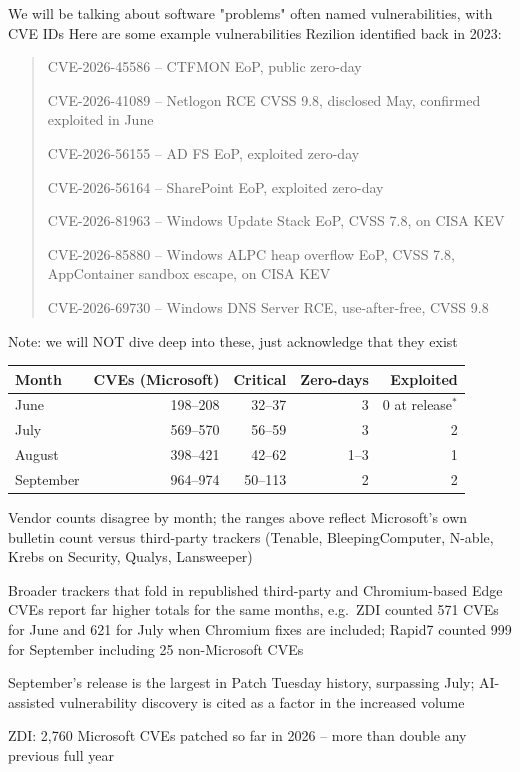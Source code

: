\documentclass[Screen16to9,17pt]{foils}
\begin{document}
We will be talking about software "problems" often named vulnerabilities, with CVE IDs
Here are some example vulnerabilities Rezilion identified back in 2023:
\begin{quote}
\begin{list2}
\item CVE-2026-45586 – CTFMON EoP, public zero-day
\item CVE-2026-41089 – Netlogon RCE CVSS 9.8, disclosed May, confirmed exploited in June
\item CVE-2026-56155 – AD FS EoP, exploited zero-day
\item CVE-2026-56164 – SharePoint EoP, exploited zero-day
\item CVE-2026-81963 – Windows Update Stack EoP, CVSS 7.8, on CISA KEV
\item CVE-2026-85880 – Windows ALPC heap overflow EoP, CVSS 7.8, AppContainer sandbox escape, on CISA KEV
\item CVE-2026-69730 – Windows DNS Server RCE, use-after-free, CVSS 9.8
\end{list2}
\end{quote}

Note: we will NOT dive deep into these, just acknowledge that they exist



\begin{tabularx}{22cm}{|X|r| r|r|r|}\hline
Month & CVEs (Microsoft) & Critical & Zero-days & Exploited \\\hline
June  & 198--208  & 32--37 & 3 & 0 at release$^{*}$ \\\hline
July  & 569--570  & 56--59 & 3 & 2 \\\hline
August & 398--421 & 42--62 & 1--3 & 1 \\\hline
September & 964--974 & 50--113 & 2 & 2 \\\hline
\end{tabularx}

\begin{list2}
\item Vendor counts disagree by month; the ranges above reflect Microsoft's own bulletin count versus third-party trackers (Tenable, BleepingComputer, N-able, Krebs on Security, Qualys, Lansweeper)
\item Broader trackers that fold in republished third-party and Chromium-based Edge CVEs report far higher totals for the same months, e.g.\ ZDI counted 571 CVEs for June and 621 for July when Chromium fixes are included; Rapid7 counted 999 for September including 25 non-Microsoft CVEs
\item September's release is the largest in Patch Tuesday history, surpassing July; AI-assisted vulnerability discovery is cited as a factor in the increased volume
\item ZDI: 2,760 Microsoft CVEs patched so far in 2026 -- more than double any previous full year
\end{list2}
\end{document}
